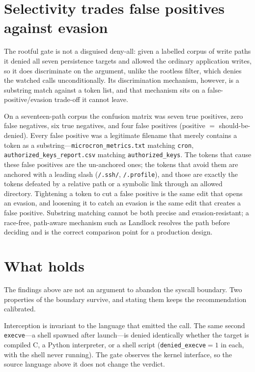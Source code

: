 \documentclass[11pt]{article}
\begin{document}
\section{Selectivity trades false positives against evasion}\label{sec:selectivity}

The rootful gate is not a disguised deny-all: given a labelled corpus of write paths it denied all
seven persistence targets and allowed the ordinary application writes, so it does discriminate on the
argument, unlike the rootless filter, which denies the watched calls unconditionally. Its
discrimination mechanism, however, is a substring match against a token list, and that mechanism sits
on a false-positive/evasion trade-off it cannot leave.

On a seventeen-path corpus the confusion matrix was seven true positives, zero false negatives, six
true negatives, and four false positives (positive $=$ should-be-denied). Every false positive was a
legitimate filename that merely contains a token as a substring---\texttt{microcron\_metrics.txt}
matching \texttt{cron}, \texttt{authorized\_keys\_report.csv} matching \texttt{authorized\_keys}. The
tokens that cause these false positives are the un-anchored ones; the tokens that avoid them are anchored
with a leading slash (\texttt{/.ssh/}, \texttt{/.profile}), and those are exactly the tokens defeated by a
relative path or a symbolic link through an allowed directory. Tightening a token to cut a false positive
is the same edit that opens an evasion, and loosening it to catch an evasion is the same edit that creates
a false positive. Substring matching cannot be both precise and evasion-resistant; a race-free, path-aware
mechanism such as Landlock resolves the path before deciding and is the correct comparison point for a
production design.

\section{What holds}\label{sec:holds}

The findings above are not an argument to abandon the syscall boundary. Two properties of the boundary
survive, and stating them keeps the recommendation calibrated.

Interception is invariant to the language that emitted the call. The same second \texttt{execve}---a
shell spawned after launch---is denied identically whether the target is compiled C, a Python
interpreter, or a shell script (\texttt{denied\_execve}$=1$ in each, with the shell never running). The
gate observes the kernel interface, so the source language above it does not change the verdict.
\end{document}
